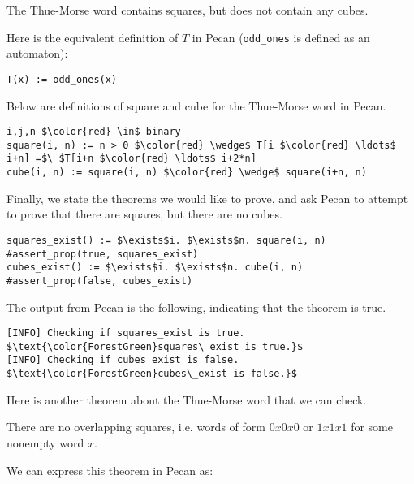 \documentclass[10pt,usenames,dvipsnames]{article}
\begin{document}
\begin{theorem}\cite{auto_seq}
    The Thue-Morse word contains squares, but does not contain any cubes.
\end{theorem}

Here is the equivalent definition of $T$ in Pecan (\texttt{odd\_ones} is defined as an automaton):
\begin{lstlisting}[language=pecan, basicstyle=\normalsize\ttfamily, mathescape=true, frame=single]
T(x) := odd_ones(x)
\end{lstlisting}

Below are definitions of square and cube for the Thue-Morse word in Pecan.

\begin{lstlisting}[language=pecan, basicstyle=\normalsize\ttfamily, mathescape=true, frame=single]
i,j,n $\color{red} \in$ binary
square(i, n) := n > 0 $\color{red} \wedge$ T[i $\color{red} \ldots$ i+n] =$\ $T[i+n $\color{red} \ldots$ i+2*n]
cube(i, n) := square(i, n) $\color{red} \wedge$ square(i+n, n)
\end{lstlisting}


Finally, we state the theorems we would like to prove, and ask Pecan to attempt to prove that there are squares, but there are no cubes.

\begin{lstlisting}[language=pecan, basicstyle=\normalsize\ttfamily, mathescape=true, frame=single]
squares_exist() := $\exists$i. $\exists$n. square(i, n)
#assert_prop(true, squares_exist)
cubes_exist() := $\exists$i. $\exists$n. cube(i, n)
#assert_prop(false, cubes_exist)
\end{lstlisting}

The output from Pecan is the following, indicating that the theorem is true.
\begin{lstlisting}[basicstyle=\normalsize\ttfamily, mathescape=true, frame=single]
[INFO] Checking if squares_exist is true.
$\text{\color{ForestGreen}squares\_exist is true.}$
[INFO] Checking if cubes_exist is false.
$\text{\color{ForestGreen}cubes\_exist is false.}$
\end{lstlisting}

Here is another theorem about the Thue-Morse word that we can check.
\begin{theorem}\cite{auto_seq}
There are no overlapping squares, i.e. words of form $0x0x0$ or $1x1x1$ for some nonempty word $x$. 
\end{theorem}

We can express this theorem in Pecan as:
\end{document}
